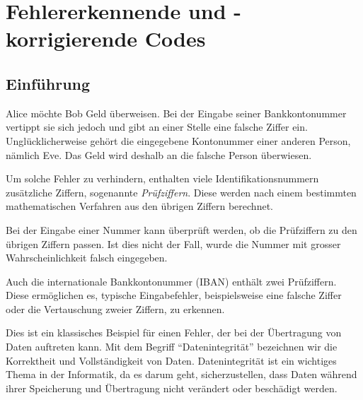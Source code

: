 \chapter{Fehlererkennende und -korrigierende Codes}

\section*{Einführung}


Alice möchte Bob Geld überweisen. Bei der Eingabe seiner
Bankkontonummer vertippt sie sich jedoch und gibt an einer Stelle
eine falsche Ziffer ein. Unglücklicherweise gehört die eingegebene
Kontonummer einer anderen Person, nämlich Eve. Das Geld wird
deshalb an die falsche Person überwiesen.

Um solche Fehler zu verhindern, enthalten viele Identifikationsnummern
zusätzliche Ziffern, sogenannte \emph{Prüfziffern}. Diese werden
nach einem bestimmten mathematischen Verfahren aus den übrigen
Ziffern berechnet.

Bei der Eingabe einer Nummer kann überprüft werden, ob die
Prüfziffern zu den übrigen Ziffern passen. Ist dies nicht der
Fall, wurde die Nummer mit grosser Wahrscheinlichkeit falsch
eingegeben.

Auch die internationale Bankkontonummer (IBAN) enthält zwei
Prüfziffern. Diese ermöglichen es, typische Eingabefehler,
beispielsweise eine falsche Ziffer oder die Vertauschung
zweier Ziffern, zu erkennen.




Dies ist ein klassisches Beispiel für einen Fehler, der bei der Übertragung von Daten auftreten kann. Mit dem Begriff \enquote{Datenintegrität} bezeichnen wir die Korrektheit und Vollständigkeit von Daten. Datenintegrität ist ein wichtiges Thema in der Informatik, da es darum geht, sicherzustellen, dass Daten während ihrer Speicherung und Übertragung nicht verändert oder beschädigt werden.

